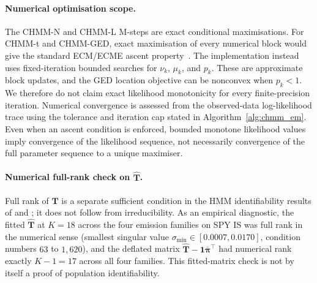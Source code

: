 \paragraph{Numerical optimisation scope.}
The CHMM-N and CHMM-L M-steps are exact conditional maximisations. For CHMM-t and CHMM-GED, exact maximisation of every numerical block would give the standard ECM/ECME ascent property~\cite{wu1983convergence, mengrubin1993ecm}. The implementation instead uses fixed-iteration bounded searches for $\nu_k$, $\mu_k$, and $p_k$. These are approximate block updates, and the GED location objective can be nonconvex when $p_k < 1$. We therefore do not claim exact likelihood monotonicity for every finite-precision iteration. Numerical convergence is assessed from the observed-data log-likelihood trace using the tolerance and iteration cap stated in Algorithm~\ref{alg:chmm_em}. Even when an ascent condition is enforced, bounded monotone likelihood values imply convergence of the likelihood sequence, not necessarily convergence of the full parameter sequence to a unique maximiser.

\paragraph{Numerical full-rank check on $\hat{\mathbf T}$.}
Full rank of $\mathbf T$ is a separate sufficient condition in the HMM identifiability results of \citet{allman2009identifiability} and \citet{gassiat2016inference}; it does not follow from irreducibility. As an empirical diagnostic, the fitted $\hat{\mathbf T}$ at $K = 18$ across the four emission families on SPY IS was full rank in the numerical sense (smallest singular value $\sigma_{\min} \in [0.0007, 0.0170]$, condition numbers $63$ to $1{,}620$), and the deflated matrix $\hat{\mathbf T} - \mathbf 1\bar{\boldsymbol\pi}^\top$ had numerical rank exactly $K - 1 = 17$ across all four families. This fitted-matrix check is not by itself a proof of population identifiability.

